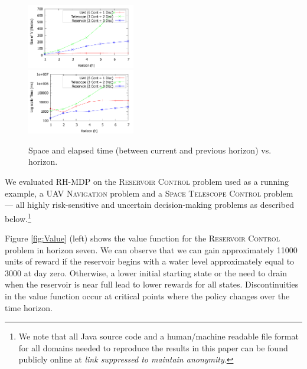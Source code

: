 \begin{figure}[tbp!]
\vspace{-2mm}
\centering

\includegraphics[width=0.42\textwidth]{Figures/Nodes.pdf}\\
\vspace{-2mm}
\includegraphics[width=0.42\textwidth]{Figures/Time.pdf}

\vspace{-2mm}
\caption{\footnotesize Space and elapsed time (between current and previous horizon) vs. horizon.
}
\label{fig:SpaceTime}
\vspace{-4mm}
\end{figure}

\label{sec:results}

We evaluated RH-MDP on the \textsc{Reservoir Control} problem used as a running example,
a \textsc{UAV Navigation} problem  and
a \textsc{Space Telescope Control} problem --- all highly risk-sensitive and uncertain
decision-making problems as described below.\footnote{We 
note that all Java source code and a
human/machine readable file format for all domains needed to reproduce
the results in this paper can be found publicly online at
\emph{link suppressed to maintain anonymity}.} %

Figure \ref{fig:Value} (left) shows the value function for the
\textsc{Reservoir Control} problem in horizon seven. We can observe
that we can gain approximately 11000 units of reward if the reservoir
begins with a water level approximately equal to 3000 at day zero.
Otherwise, a lower initial starting state or the need to drain when
the reservoir is near full lead to lower rewards for all states.
Discontinuities in the value function occur at critical points where
the policy changes over the time horizon.

